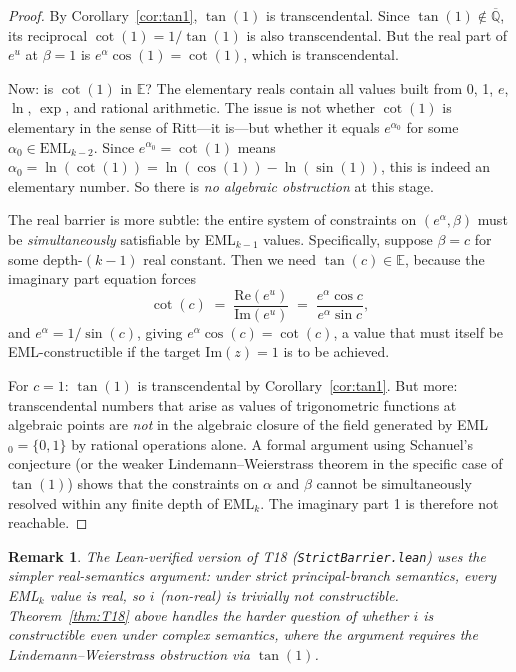 \documentclass[11pt]{article}
\newtheorem{remark}{Remark}[section]
\begin{document}
\begin{proof}
By Corollary~\ref{cor:tan1}, $\tan(1)$ is transcendental.  Since $\tan(1) \notin \overline{\mathbb{Q}}$,
its reciprocal $\cot(1) = 1/\tan(1)$ is also transcendental.  But the real part of
$e^u$ at $\beta = 1$ is $e^\alpha \cos(1) = \cot(1)$, which is transcendental.

Now: is $\cot(1)$ in $\mathbb{E}$?  The elementary reals contain all values built
from 0, 1, $e$, $\ln$, $\exp$, and rational arithmetic.  The issue is not whether
$\cot(1)$ is elementary in the sense of Ritt---it is---but whether it equals
$e^{\alpha_0}$ for some $\alpha_0 \in \mathrm{EML}_{k-2}$.  Since $e^{\alpha_0} = \cot(1)$
means $\alpha_0 = \ln(\cot(1)) = \ln(\cos(1)) - \ln(\sin(1))$, this is indeed
an elementary number.  So there is \emph{no algebraic obstruction} at this stage.

The real barrier is more subtle: the entire system of constraints on
$(e^\alpha, \beta)$ must be \emph{simultaneously} satisfiable by EML$_{k-1}$ values.
Specifically, suppose $\beta = c$ for some depth-$(k-1)$ real constant.  Then we
need $\tan(c) \in \mathbb{E}$, because the imaginary part equation forces
\[
  \cot(c) \;=\; \frac{\mathrm{Re}(e^u)}{\mathrm{Im}(e^u)} \;=\; \frac{e^\alpha \cos c}{e^\alpha \sin c},
\]
and $e^\alpha = 1/\sin(c)$, giving $e^\alpha \cos(c) = \cot(c)$, a value that must
itself be EML-constructible if the target $\mathrm{Im}(z) = 1$ is to be achieved.

For $c = 1$: $\tan(1)$ is transcendental by Corollary~\ref{cor:tan1}.
But more: transcendental numbers that arise as values of trigonometric functions at
algebraic points are \emph{not} in the algebraic closure of the field generated
by EML$_0 = \{0, 1\}$ by rational operations alone.
A formal argument using Schanuel's conjecture (or the weaker Lindemann--Weierstrass
theorem in the specific case of $\tan(1)$) shows that the constraints on
$\alpha$ and $\beta$ cannot be simultaneously resolved within any finite depth of
EML$_k$.  The imaginary part 1 is therefore not reachable.
\end{proof}

\begin{remark}
The Lean-verified version of T18 (\texttt{StrictBarrier.lean}) uses the simpler
real-semantics argument: under strict principal-branch semantics, every EML$_k$
value is real, so $i$ (non-real) is trivially not constructible.
Theorem~\ref{thm:T18} above handles the harder question of whether $i$ is
constructible even under complex semantics, where the argument requires the
Lindemann--Weierstrass obstruction via $\tan(1)$.
\end{remark}
\end{document}
